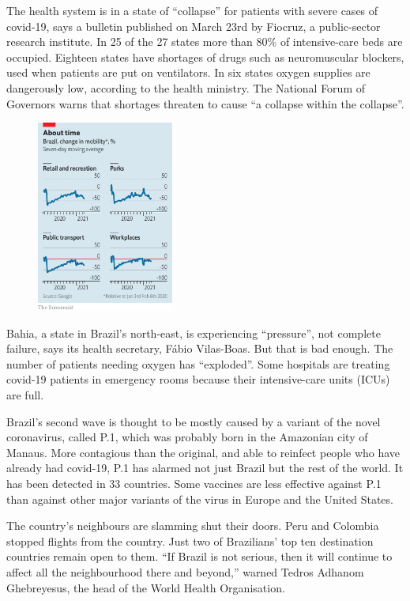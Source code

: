 \documentclass{article}
\begin{document}
The health system is in a state of ``collapse'' for patients with severe cases of covid-19, says a bulletin published on March 23rd by Fiocruz, a public-sector research institute. In 25 of the 27 states more than 80\% of intensive-care beds are occupied. Eighteen states have shortages of drugs such as neuromuscular blockers, used when patients are put on ventilators. In six states oxygen supplies are dangerously low, according to the health ministry. The National Forum of Governors warns that shortages threaten to cause ``a collapse within the collapse''. 

\begin{figure}[h]
\centering
\includegraphics[width=0.4\textwidth]{images/20210327_amc276.png}
\end{figure}


Bahia, a state in Brazil's north-east, is experiencing ``pressure'', not complete failure, says its health secretary, Fábio Vilas-Boas. But that is bad enough. The number of patients needing oxygen has ``exploded''. Some hospitals are treating covid-19 patients in emergency rooms because their intensive-care units (ICUs) are full. 

Brazil's second wave is thought to be mostly caused by a variant of the novel coronavirus, called P.1, which was probably born in the Amazonian city of Manaus. More contagious than the original, and able to reinfect people who have already had covid-19, P.1 has alarmed not just Brazil but the rest of the world. It has been detected in 33 countries. Some vaccines are less effective against P.1 than against other major variants of the virus in Europe and the United States. 

The country's neighbours are slamming shut their doors. Peru and Colombia stopped flights from the country. Just two of Brazilians' top ten destination countries remain open to them. ``If Brazil is not serious, then it will continue to affect all the neighbourhood there and beyond,'' warned Tedros Adhanom Ghebreyesus, the head of the World Health Organisation. 
\end{document}
